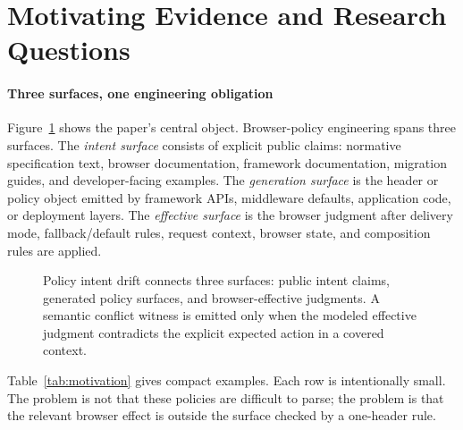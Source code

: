 \documentclass[10pt,conference]{IEEEtran}
\begin{document}
\section{Motivating Evidence and Research Questions}

\paragraph{Three surfaces, one engineering obligation}

Figure~\ref{fig:drift-model} shows the paper's central object. Browser-policy engineering spans three surfaces. The \emph{intent surface} consists of explicit public claims: normative specification text, browser documentation, framework documentation, migration guides, and developer-facing examples. The \emph{generation surface} is the header or policy object emitted by framework APIs, middleware defaults, application code, or deployment layers. The \emph{effective surface} is the browser judgment after delivery mode, fallback/default rules, request context, browser state, and composition rules are applied.

\begin{figure}[t]
\centering

\caption{Policy intent drift connects three surfaces: public intent claims, generated policy surfaces, and browser-effective judgments. A semantic conflict witness is emitted only when the modeled effective judgment contradicts the explicit expected action in a covered context.}
\label{fig:drift-model}
\end{figure}

Table~\ref{tab:motivation} gives compact examples. Each row is intentionally small. The problem is not that these policies are difficult to parse; the problem is that the relevant browser effect is outside the surface checked by a one-header rule.
\end{document}

